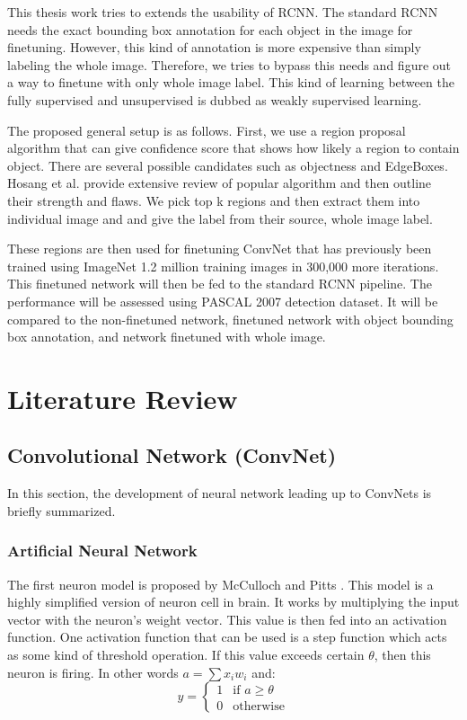 \documentclass[a4paper,11pt]{kth-mag}
\begin{document}
This thesis work tries to extends the usability of RCNN. The standard RCNN needs the exact bounding box annotation for each object in the image for finetuning. However, this kind of annotation is more expensive than simply labeling the whole image. Therefore, we tries to bypass this needs and figure out a way to finetune with only whole image label. This kind of learning between the fully supervised and unsupervised is dubbed as weakly supervised learning.

The proposed general setup is as follows. First, we use a region proposal algorithm that can give confidence score that shows how likely a region to contain object. There are several possible candidates such as objectness \cite{obj} and EdgeBoxes. Hosang et al. \cite{hosang2014} provide extensive review of popular algorithm and then outline their strength and flaws. We pick top k regions and then extract them into individual image and and give the label from their source, whole image label.

These regions are then used for finetuning ConvNet that has previously been trained using ImageNet 1.2 million training images in 300,000 more iterations. This finetuned network will then be fed to the standard RCNN pipeline. The performance will be assessed using PASCAL 2007 detection dataset. It will be compared to the non-finetuned network, finetuned network with object bounding box annotation, and network finetuned with whole image.


\chapter{Literature Review}
\section{Convolutional Network (ConvNet)}
In this section, the development of neural network leading up to ConvNets is briefly summarized.

\subsection{Artificial Neural Network}
The first neuron model is proposed by McCulloch and Pitts \cite{mcculloch1943neuron}. This model is a highly simplified version of neuron cell in brain. It works by multiplying the input vector with the neuron's weight vector. This value is then fed into an activation function. One activation function that can be used is a step function which acts as some kind of threshold operation. If this value exceeds certain $\theta$, then this neuron is firing. In other words $ a = \sum x_i w_i $ and:
\begin{equation}
y = 
	\begin{cases}
	1 & \text{if } a \geq \theta \\
	0 & \text{otherwise}
	\end{cases}
\end{equation}
\end{document}
